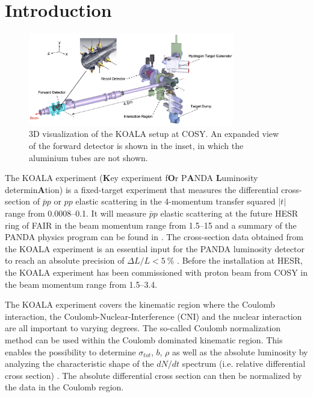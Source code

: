 \documentclass[number,5p]{elsarticle}
\begin{document}

\section{Introduction}
\label{sec:introduction}

\begin{figure}[htbp]
	\centering
	\includegraphics[width=0.8\textwidth]{./koala_setup_new.png}
	\caption{3D visualization of the KOALA setup at COSY. An expanded view of the
  forward detector is shown in the inset, in which the aluminium tubes are not shown.}
	\label{fig:setup}
\end{figure}

The KOALA experiment (\textbf{K}ey experiment f\textbf{O}r P\textbf{A}NDA
\textbf{L}uminosity determin\textbf{A}tion) is a fixed-target experiment that
measures the differential cross-section of $\bar{p}p$ or $pp$ elastic scattering
in the 4-momentum transfer squared $|t|$ range from \SIrange{0.0008}{0.1}{\tmom}.
It will measure $\bar{p}p$ elastic scattering at the future HESR ring of FAIR \cite{FAIR} in the beam momentum range from
\SIrange{1.5}{15}{\momentum} and a summary of the PANDA physics program can be found
in \cite{panda}.
The cross-section data obtained from the KOALA experiment is an essential input for the PANDA luminosity detector to
reach an absolute precision of $\Delta L/L < \SI{5}{\percent}$ \cite{lmd_tdr}.
Before the installation at HESR, the KOALA experiment has been commissioned with
proton beam from COSY \cite{COSY} in the beam momentum range from \SIrange{1.5}{3.4}{\momentum}.

The KOALA experiment covers the kinematic region where the
Coulomb interaction, the Coulomb-Nuclear-Interference (CNI) and the nuclear interaction are all important to varying degrees.
The so-called Coulomb normalization method \cite{bernard1987real,jenni2008atlas}
can be used within the Coulomb dominated kinematic region.
This enables the possibility to determine \({\sigma}_{tot}\), \(b\), \(\rho\) as well as
the absolute luminosity by analyzing the characteristic shape of the $dN/dt$
spectrum (i.e. relative differential cross section) \cite{koala_article}.
The absolute differential cross section can then be normalized by the data in the
Coulomb region.
\end{document}
